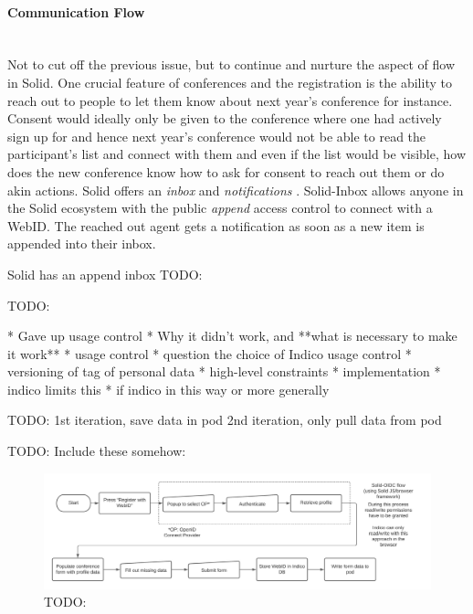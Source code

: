 \paragraph{Communication Flow}\mbox{}\\

Not to cut off the previous issue, but to continue and nurture the aspect of flow in Solid. One crucial feature of conferences and the registration is the ability to reach out to people to let them know about next year's conference for instance. Consent would ideally only be given to the conference where one had actively sign up for and hence next year's conference would not be able to read the participant's list and connect with them and even if the list would be visible, how does the new conference know how to ask for consent to reach out them or do akin actions. Solid offers an \textit{inbox} and \textit{notifications} \cite{solid-inbox}. Solid-Inbox allows anyone in the Solid ecosystem with the public \textit{append} access control to connect with a WebID. The reached out agent gets a notification as soon as a new item is appended into their inbox. 


Solid has an append inbox
TODO:


TODO:


* Gave up usage control
  * Why it didn't work, and **what is necessary to make it work**
    * usage control
    * question the choice of Indico usage control
    * versioning of tag of personal data
* high-level constraints
* implementation
  * indico limits this
* if indico in this way or more generally

TODO:
1st iteration, save data in pod
2nd iteration, only pull data from pod

TODO: Include these somehow:

\begin{figure}
    \centering
    \includegraphics[width=1\textwidth]{prototype/graphs/poc-conference_registration_flow-client_side-sideways.jpeg}
    \caption{TODO:}
    \label{fig:poc-conference_registration_flow-client_side-sideways}
\end{figure}

